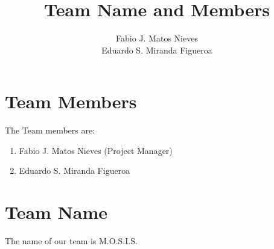 \documentclass{article}
\author{Fabio J. Matos Nieves \\ Eduardo S. Miranda Figueroa}
\title{Team Name and Members}
\begin{document}
\maketitle
\section{Team Members}
The Team members are:
\begin{enumerate}
    \item Fabio J. Matos Nieves (Project Manager)
    \item Eduardo S. Miranda Figueroa
\end{enumerate}
\section{Team Name}
The name of our team is M.O.S.I.S.
\end{document}
